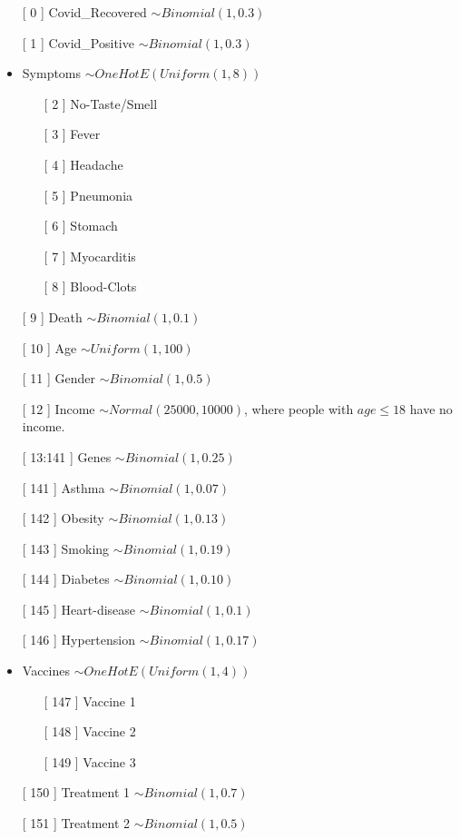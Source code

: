 \begin{itemize}
    \item[[ 0]] Covid\_Recovered $\sim Binomial(1, 0.3)$
    \item[[ 1]] Covid\_Positive $\sim Binomial(1, 0.3)$
    \item Symptoms $\sim OneHotE(Uniform(1, 8))$
    \begin{itemize}
        \item[[ 2]] No-Taste/Smell
        \item[[ 3]] Fever
        \item[[ 4]] Headache
        \item[[ 5]] Pneumonia
        \item[[ 6]] Stomach
        \item[[ 7]] Myocarditis
        \item[[ 8]] Blood-Clots
    \end{itemize}
    \item[[ 9]] Death $\sim Binomial(1, 0.1)$
    \item[[ 10]] Age $\sim Uniform(1, 100)$
    \item[[ 11]] Gender $\sim Binomial(1, 0.5)$
    \item[[ 12]] Income $\sim Normal(25000, 10000)$, where people with $age \leq 18$ have no income.
    \item[[ 13:141]] Genes $\sim Binomial(1, 0.25)$
    \item[[ 141]] Asthma $\sim Binomial(1, 0.07)$
    \item[[ 142]] Obesity $\sim Binomial(1, 0.13)$
    \item[[ 143]] Smoking $\sim Binomial(1, 0.19)$
    \item[[ 144]] Diabetes $\sim Binomial(1, 0.10)$
    \item[[ 145]] Heart-disease $\sim Binomial(1, 0.1)$
    \item[[ 146]] Hypertension $\sim Binomial(1, 0.17)$
    \item Vaccines $\sim OneHotE(Uniform(1, 4))$
        \begin{itemize}
        \item[[ 147]] Vaccine 1
        \item[[ 148]] Vaccine 2
        \item[[ 149]] Vaccine 3
    \end{itemize}
    \item[[ 150]] Treatment 1 $\sim Binomial(1, 0.7)$
    \item[[ 151]] Treatment 2 $\sim Binomial(1, 0.5)$
\end{itemize}

